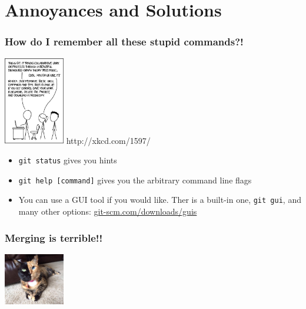 \documentclass{beamer}
\begin{document}
\section{Annoyances and Solutions}
\begin{frame}[fragile]
\frametitle{How do I remember all these stupid commands?!}
\includegraphics[width=100px]{git.png}
http://xkcd.com/1597/
\begin{itemize}
\item \lstinline{git status} gives you hints
\item \lstinline{git help [command]} gives you the arbitrary command line flags
\item You can use a GUI tool if you would like. Ther is a built-in one, \lstinline{git gui}, and many other options:
\href{git-scm.com/downloads/guis}{git-scm.com/downloads/guis}
\end{itemize}

\end{frame}




\begin{frame}[fragile]
\frametitle{Merging is terrible!!}
\includegraphics[width=100px]{chimera.jpg}
\end{frame}
\end{document}
